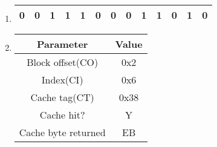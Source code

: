 \documentclass{article}
\begin{document}
\begin{enumerate}[label=\textbf{\Alph*.}]
	\item
	\begin{tabular}{|c|c|c|c|c|c|c|c|c|c|c|c|c|}
		\hline
		0 & 0 & 1 & 1 & 1 & 0 & 0 & 0 & 1 & 1 & 0 & 1 & 0 \\
		\hline
	\end{tabular}
	\item
	\begin{tabular}{c c}
		Parameter & Value \\
		\hline
		Block offset(CO) & 0x2 \\
		Index(CI) & 0x6 \\
		Cache tag(CT) & 0x38 \\
		Cache hit? & Y \\
		Cache byte returned & EB \\
	\end{tabular}
\end{enumerate}
\end{document}
